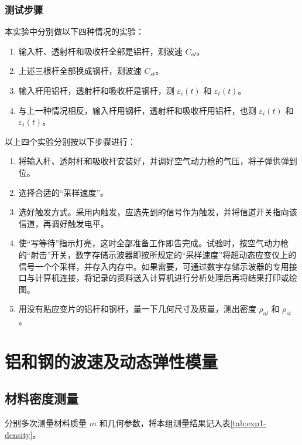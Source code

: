\documentclass[UTF8,a4paper,12pt]{ctexart}
\numberwithin{equation}{section}
\begin{document}
\subsubsection{测试步骤}
本实验中分别做以下四种情况的实验：
\begin{enumerate}[label=\alph*)]
  \item 输入杆、透射杆和吸收杆全部是铝杆，测波速 $C_{al}$。
  \item 上述三根杆全部换成钢杆，测波速 $C_{st}$。
  \item 输入杆用铝杆，透射杆和吸收杆是钢杆，测 $\varepsilon_i(t)$ 和 $\varepsilon_t(t)$。
  \item 与上一种情况相反，输入杆用钢杆，透射杆和吸收杆用铝杆，也测 $\varepsilon_i(t)$ 和 $\varepsilon_t(t)$。
\end{enumerate}
以上四个实验分别按以下步骤进行：
\begin{enumerate}
  \item 将输入杆、透射杆和吸收杆安装好，并调好空气动力枪的气压，将子弹供弹到位。
  \item 选择合适的“采样速度”。
  \item 选好触发方式。采用内触发，应选先到的信号作为触发，并将信道开关指向该信道，再调好触发电平。
  \item 使“写等待”指示灯亮，这时全部准备工作即告完成。试验时，按空气动力枪的“射击”开关，数字存储示波器即按所规定的“采样速度”将超动态应变仪上的信号一个个采样，并存入内存中。如果需要，可通过数字存储示波器的专用接口与计算机连接，将记录的资料送入计算机进行分析处理后再将结果打印或绘图。
  \item 用没有贴应变片的铝杆和钢杆，量一下几何尺寸及质量，测出密度 $\rho_{al}$ 和 $\rho_{st}$。
\end{enumerate}

\section{铝和钢的波速及动态弹性模量}
\subsection{材料密度测量}
分别多次测量材料质量 $m$ 和几何参数，将本组测量结果记入表\ref{tab:exp1-density}。
\end{document}
